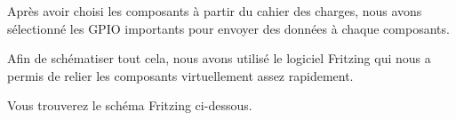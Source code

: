 Après avoir choisi les composants à partir du cahier des charges, nous avons sélectionné les GPIO importants pour envoyer des données à chaque composants.

Afin de schématiser tout cela, nous avons utilisé le logiciel Fritzing qui nous a permis de relier les composants virtuellement assez rapidement.

Vous trouverez le schéma Fritzing ci-dessous.

\newpage